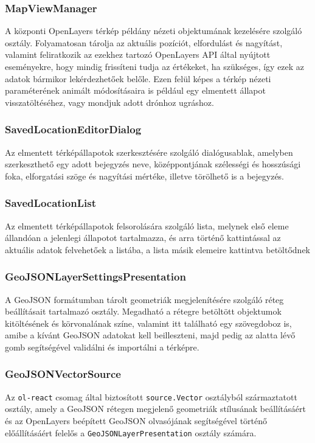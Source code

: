 \subsubsection{MapViewManager}
A központi OpenLayers térkép példány nézeti objektumának kezelésére szolgáló
osztály. Folyamatosan tárolja az aktuális pozíciót, elfordulást és nagyítást,
valamint feliratkozik az ezekhez tartozó OpenLayers API által nyújtott
eseményekre, hogy mindig frissíteni tudja az értékeket, ha szükséges, így ezek
az adatok bármikor lekérdezhetőek belőle. Ezen felül képes a térkép nézeti
paraméterének animált módosításaira is például egy elmentett állapot
visszatöltéséhez, vagy mondjuk adott drónhoz ugráshoz.

\subsubsection{SavedLocationEditorDialog}
Az elmentett térképállapotok szerkesztésére szolgáló dialógusablak, amelyben
szerkeszthető egy adott bejegyzés neve, középpontjának szélességi és hosszúsági
foka, elforgatási szöge és nagyítási mértéke, illetve törölhető is a bejegyzés.

\subsubsection{SavedLocationList}
Az elmentett térképállapotok felsorolására szolgáló lista, melynek első eleme
állandóan a jelenlegi állapotot tartalmazza, és arra történő kattintással az
aktuális adatok felvehetőek a listába, a lista másik elemeire kattintva
betöltődnek

\subsubsection{GeoJSONLayerSettingsPresentation}
A GeoJSON formátumban tárolt geometriák megjelenítésére szolgáló réteg
beállításait tartalmazó osztály. Megadható a rétegre betöltött objektumok
kitöltésének és körvonalának színe, valamint itt található egy szövegdoboz is,
amibe a kívánt GeoJSON adatokat kell beilleszteni, majd pedig az alatta lévő
gomb segítségével validálni és importálni a térképre.

\subsubsection{GeoJSONVectorSource}
Az \verb|ol-react| csomag által biztosított \verb|source.Vector| osztályból
származtatott osztály, amely a GeoJSON rétegen megjelenő geometriák stílusának
beállításáért és az OpenLayers beépített GeoJSON olvasójának segítségével
történő előállításáért felelős a \verb|GeoJSONLayerPresentation| osztály
számára.

